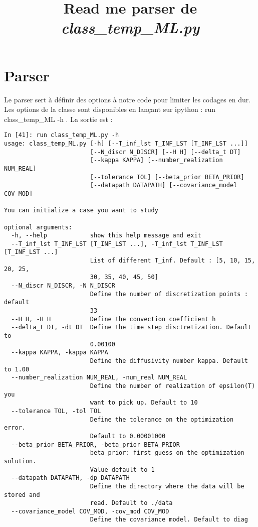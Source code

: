 \documentclass[a4paper,12pt]{article}
\title{Read me parser de \brick \textit{class\_temp\_ML.py}\bk }%
\date{}
\newcommand\bk{\color{black}}
\newcommand\brick{\color{brick}}
\numberwithin{equation}{section} %
\begin{document}
\maketitle
\section*{Parser}
Le parser sert à définir des options à notre code pour limiter les codages en dur.\\
\noindent Les options de la classe sont disponibles en lançant sur ipython : \brick run class\_temp\_ML -h \bk. La sortie est : 

\begin{lstlisting}
In [41]: run class_temp_ML.py -h
usage: class_temp_ML.py [-h] [--T_inf_lst T_INF_LST [T_INF_LST ...]]
                        [--N_discr N_DISCR] [--H H] [--delta_t DT]
                        [--kappa KAPPA] [--number_realization NUM_REAL]
                        [--tolerance TOL] [--beta_prior BETA_PRIOR]
                        [--datapath DATAPATH] [--covariance_model COV_MOD]

You can initialize a case you want to study

optional arguments:
  -h, --help            show this help message and exit
  --T_inf_lst T_INF_LST [T_INF_LST ...], -T_inf_lst T_INF_LST [T_INF_LST ...]
                        List of different T_inf. Default : [5, 10, 15, 20, 25,
                        30, 35, 40, 45, 50]
  --N_discr N_DISCR, -N N_DISCR
                        Define the number of discretization points : default
                        33
  --H H, -H H           Define the convection coefficient h
  --delta_t DT, -dt DT  Define the time step disctretization. Default to
                        0.00100
  --kappa KAPPA, -kappa KAPPA
                        Define the diffusivity number kappa. Default to 1.00
  --number_realization NUM_REAL, -num_real NUM_REAL
                        Define the number of realization of epsilon(T) you
                        want to pick up. Default to 10
  --tolerance TOL, -tol TOL
                        Define the tolerance on the optimization error.
                        Default to 0.00001000
  --beta_prior BETA_PRIOR, -beta_prior BETA_PRIOR
                        beta_prior: first guess on the optimization solution.
                        Value default to 1
  --datapath DATAPATH, -dp DATAPATH
                        Define the directory where the data will be stored and
                        read. Default to ./data
  --covariance_model COV_MOD, -cov_mod COV_MOD
                        Define the covariance model. Default to diag
\end{lstlisting}
\end{document}
